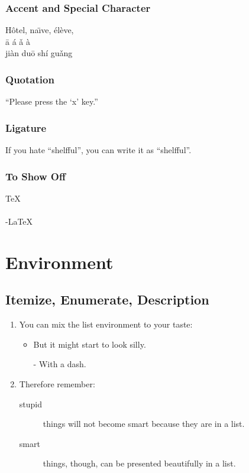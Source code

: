 \documentclass[12pt]{article}
\begin{document}
\subsubsection{Accent and Special Character}
H\^otel, na\"\i ve, \'el\`eve,\\
\= a \' a \v a \` a \\
ji\` an du\= o sh\' i gu\v ang

\subsubsection{Quotation}
``Please press the `x' key.''

\subsubsection{Ligature}
If you hate ``shelfful'', you can write it as ``shelf\mbox{}ful''.

\subsubsection{To Show Off}
\TeX \\
\LaTeXe \\
\AmS-\LaTeX \\

\section{Environment}
\subsection{Itemize, Enumerate, Description}
\begin{enumerate}
	\item You can mix the list environment to your taste:
	      \begin{itemize}
		      \item But it might start to look silly.
		      \item[-] With a dash.
	      \end{itemize}
	\item Therefore remember:
	      \begin{description}
		      \item[stupid] things will not become smart because they are in a list.
		      \item[smart] things, though, can be presented beautifully in a list.
	      \end{description}
\end{enumerate}
\end{document}
